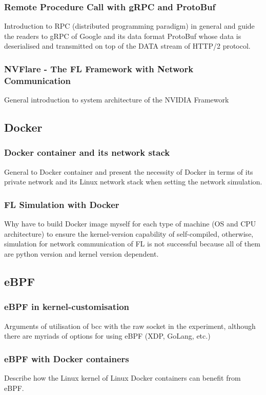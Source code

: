 \documentclass{article}
\begin{document}
\subsubsection{Remote Procedure Call with gRPC and ProtoBuf}
Introduction to RPC (distributed programming paradigm) in general and guide
the readers to gRPC of Google and its data format ProtoBuf whose data is
deserialised and transmitted on top of the DATA stream of HTTP/2 protocol.
\subsubsection{NVFlare - The FL Framework with Network Communication}
General introduction to system architecture of the NVIDIA Framework

\subsection{Docker}
\subsubsection{Docker container and its network stack}
General to Docker container and present the necessity of Docker in terms of its
private network and its Linux network stack when setting the network simulation.
\subsubsection{FL Simulation with Docker}
Why have to build Docker image myself for each type of machine (OS and CPU
architecture) to ensure the kernel-version capability of self-compiled,
otherwise, simulation for network communication of FL is not successful
because all of them are python version and kernel version dependent.

\subsection{eBPF}
\subsubsection{eBPF in kernel-customisation}
Arguments of utilisation of bcc with the raw socket in the experiment, although
there are myriads of options for using eBPF (XDP, GoLang, etc.)
\subsubsection{eBPF with Docker containers}
Describe how the Linux kernel of Linux Docker containers can benefit from eBPF.
\end{document}
